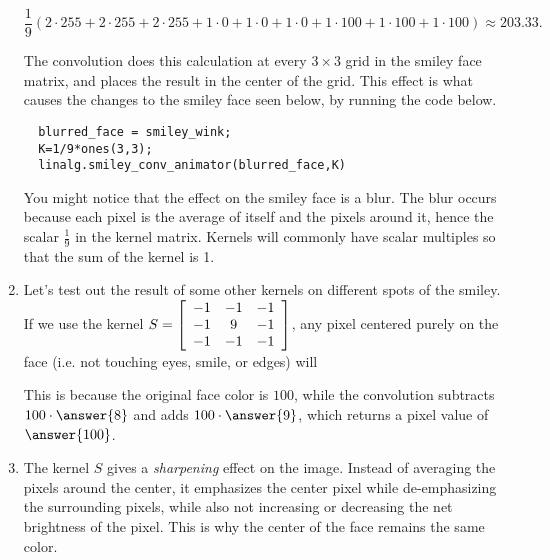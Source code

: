 \documentclass{ximera}
\begin{document}
\begin{problem}
\begin{enumerate}
  $$\frac{1}{9}(2\cdot 255+2\cdot 255+2\cdot 255+1\cdot 0+1\cdot 0+1\cdot 0+1\cdot 100+1\cdot 100+1\cdot 100)\approx 203.33.$$

The convolution does this calculation at every $3\times 3$ grid in the smiley face matrix, and places the result in the center of the grid. This effect is what causes the changes to the smiley face seen below, by running the code below.

\begin{verbatim}
  blurred_face = smiley_wink;
  K=1/9*ones(3,3);
  linalg.smiley_conv_animator(blurred_face,K)
\end{verbatim}

\begin{center}
\end{center}

You might notice that the effect on the smiley face is a blur. The blur occurs because each pixel is the average of itself and the pixels around it, hence the scalar $\frac{1}{9}$ in the kernel matrix. Kernels will commonly have scalar multiples so that the sum of the kernel is 1.

\item Let's test out the result of some other kernels on different spots of the smiley. If we use the kernel %
$S=\startmat{ccc}
-1 & -1 & -1\\
-1 & 9 & -1\\
-1 & -1 & -1
\stopmat$, any pixel centered purely on the face (i.e. not touching eyes, smile, or edges) will
\begin{multipleChoice}
\end{multipleChoice}
This is because the original face color is $100$, while the convolution subtracts $100\cdot\answer{8}$ and adds $100\cdot\answer{9}$, which returns a pixel value of $\answer{100}$.

\item The kernel $S$ gives a \emph{sharpening} effect on the image. Instead of averaging the pixels around the center, it emphasizes the center pixel while de-emphasizing the surrounding pixels, while also not increasing or decreasing the net brightness of the pixel. This is why the center of the face remains the same color.


\end{enumerate}
\end{problem}
\end{document}
